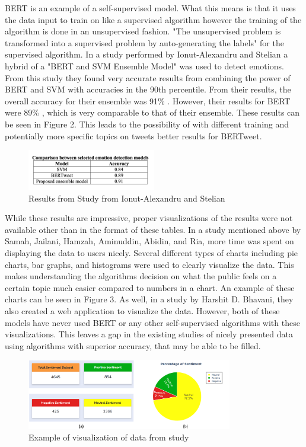 \documentclass[conference]{IEEEtran}
\begin{document}
BERT is an example of a self-supervised model. 
What this means is that it uses the data input to train on like a supervised algorithm however the training of the algorithm is done in an unsupervised fashion.
"The unsupervised problem is transformed into a supervised problem by auto-generating the labels\cite{b9}" for the supervised algorithm.
In a study performed by Ionut-Alexandru and Stelian a hybrid of a "BERT and SVM Ensemble Model\cite{b8}" was used to detect emotions.
From this study they found very accurate results from combining the power of BERT and SVM with accuracies in the 90th percentile.
From their results, the overall accuracy for their ensemble was 91\% \cite{b8}.
However, their results for BERT were 89\% \cite{b8}, which is very comparable to that of their ensemble.
These results can be seen in Figure 2.
This leads to the possibility of with different training and potentially more specific topics on tweets better results for BERTweet.

\begin{figure}[b]
    \centerline{\includegraphics[width=0.5\textwidth]{BERTweetChartFromStudy.png}}
    \caption{Results from Study from Ionut-Alexandru and Stelian\cite{b8}}
\end{figure}

While these results are impressive, proper visualizations of the results were not available other than in the format of these tables.
In a study mentioned above by Samah, Jailani, Hamzah, Aminuddin, Abidin, and Ria, more time was spent on displaying the data to users nicely.
Several different types of charts including pie charts, bar graphs, and histograms were used to clearly visualize the data.
This makes understanding the algorithms decision on what the public feels on a certain topic much easier compared to numbers in a chart.
An example of these charts can be seen in Figure 3. 
As well, in a study by Harshit D. Bhavani, they also created a web application to visualize the data\cite{b3}. 
However, both of these models have never used BERT or any other self-supervised algorithms with these visualizations.
This leaves a gap in the existing studies of nicely presented data using algorithms with superior accuracy, that may be able to be filled. 

\begin{figure}[t]
    \centering
    \includegraphics[width=0.8\textwidth]{BetterVisualizationsOfData.png}
    \caption{Example of visualization of data from study\cite{b2}}
\end{figure}
\end{document}
